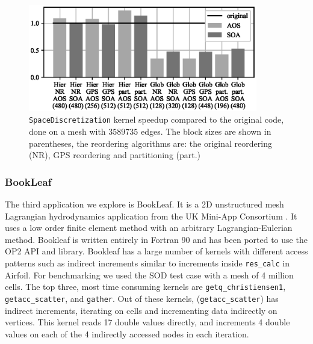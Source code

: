 \begin{figure}[Htbp]
  \centering
  \includegraphics[width=10cm]{fig/volna_speedup.eps}
  \caption{\texttt{SpaceDiscretization} kernel speedup compared to the 
original
  code, done on a mesh with $3589735$ edges. The block sizes are shown in
  parentheses, the reordering algorithms are: the original reordering (NR), GPS
  reordering and partitioning (part.)}
  \label{fig:volna_speedup}
\end{figure}



\subsubsection{BookLeaf}
\noindent The third application we explore is BookLeaf. It is a 2D unstructured 
mesh Lagrangian hydrodynamics application from the UK Mini-App Consortium 
\cite{uk-mac}. It uses a low order finite element method with an arbitrary 
Lagrangian-Eulerian method.  Bookleaf is written entirely in Fortran 90 and has 
been ported to use the OP2 API and library. Bookleaf has a large number of 
kernels with different access patterns such as indirect increments similar to 
increments inside \texttt{res\_calc} in Airfoil. For benchmarking we used the 
SOD test case with a mesh of 4 million cells. The top three, most 
time consuming kernels are \texttt{getq\_christiensen1}, 
\texttt{getacc\_scatter}, and \texttt{gather}. Out of these kernels, 
(\texttt{getacc\_scatter}) has indirect increments, iterating on cells and 
incrementing data indirectly on vertices. This kernel reads 17 double values 
directly, and increments 4 double values on each of the 4 indirectly accessed 
nodes in each iteration.

